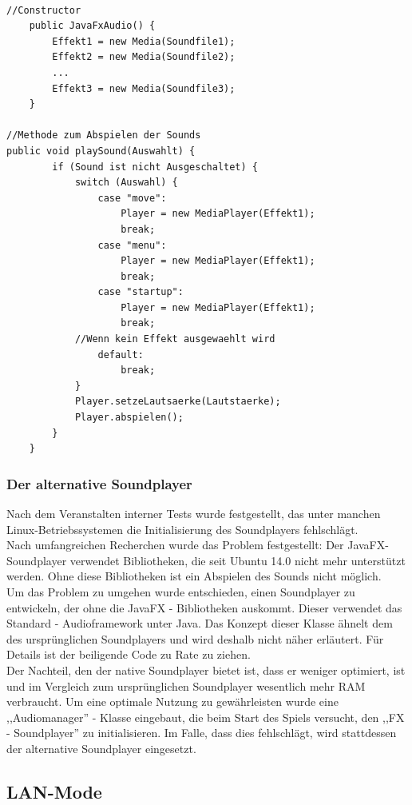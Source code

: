 \documentclass[12pt,a4paper]{article}
\begin{document}
\lstset{language=java}
\begin{lstlisting}

//Constructor
	public JavaFxAudio() {
		Effekt1 = new Media(Soundfile1);
		Effekt2 = new Media(Soundfile2);
		...
		Effekt3 = new Media(Soundfile3);
	}
	
//Methode zum Abspielen der Sounds
public void playSound(Auswahlt) {
		if (Sound ist nicht Ausgeschaltet) {
			switch (Auswahl) {
				case "move":
					Player = new MediaPlayer(Effekt1);
					break;
				case "menu":
					Player = new MediaPlayer(Effekt1);
					break;
				case "startup":
					Player = new MediaPlayer(Effekt1);
					break;
			//Wenn kein Effekt ausgewaehlt wird
				default:
					break;
			}
			Player.setzeLautsaerke(Lautstaerke);
			Player.abspielen();
		}
	}
\end{lstlisting}

\subsubsection{Der alternative  Soundplayer}
\label{SUBSUBSEC:SOUNDBUG}

Nach dem Veranstalten interner Tests wurde festgestellt, das unter manchen Linux-Betriebssystemen die Initialisierung des Soundplayers fehlschlägt.\\
Nach umfangreichen Recherchen wurde das Problem festgestellt: Der JavaFX-Soundplayer verwendet Bibliotheken, die seit Ubuntu 14.0 nicht mehr unterstützt werden. Ohne diese Bibliotheken ist ein Abspielen des Sounds nicht möglich. \\Um das Problem zu umgehen wurde entschieden, einen Soundplayer zu entwickeln, der ohne die JavaFX - Bibliotheken auskommt. Dieser verwendet das Standard - Audioframework unter Java.  Das Konzept dieser Klasse ähnelt dem des ursprünglichen Soundplayers und wird deshalb nicht näher erläutert. Für Details ist der beiligende Code zu Rate zu ziehen. \\
Der Nachteil, den der native Soundplayer bietet ist, dass er weniger optimiert, ist und im Vergleich zum ursprünglichen Soundplayer wesentlich mehr RAM verbraucht. Um eine optimale Nutzung zu gewährleisten wurde eine ,,Audiomanager'' - Klasse eingebaut, die beim Start des Spiels versucht, den ,,FX - Soundplayer'' zu initialisieren. Im Falle, dass dies fehlschlägt, wird stattdessen der alternative Soundplayer eingesetzt. 

\newpage
\subsection{LAN-Mode}
\end{document}
